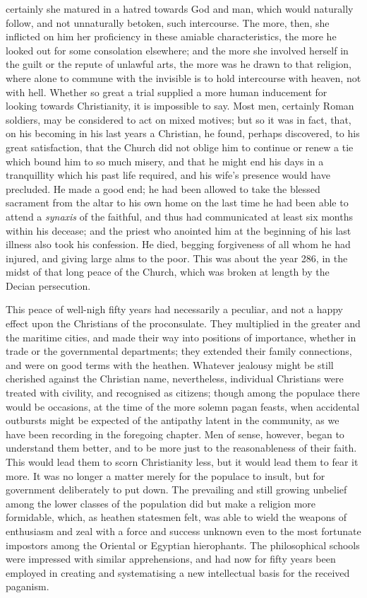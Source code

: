 certainly she matured in a hatred towards God and man, which would
naturally follow, and not unnaturally betoken, such intercourse. The
more, then, she inflicted on him her proficiency in these amiable
characteristics, the more he looked out for some consolation
elsewhere; and the more she involved herself in the guilt or the
repute of unlawful arts, the more was he drawn to that religion, where
alone to commune with the invisible is to hold intercourse with
heaven, not with hell. Whether so great a trial supplied a more human
inducement for looking towards Christianity, it is impossible to say.
Most men, certainly Roman soldiers, may be considered to act on mixed
motives; but so it was in fact, that, on his becoming in his last
years a Christian, he found, perhaps discovered, to his great
satisfaction, that the Church did not oblige him to continue or
renew a tie which bound him to so much misery, and that he might end
his days in a tranquillity which his past life required, and his
wife's presence would have precluded. He made a good end; he had been
allowed to take the blessed sacrament from the altar to his own home
on the last time he had been able to attend a \emph{synaxis} of the
faithful, and thus had communicated at least six months within his
decease; and the priest who anointed him at the beginning of his last
illness also took his confession. He died, begging forgiveness of all
whom he had injured, and giving large alms to the poor. This was about
the year 286, in the midst of that long peace of the Church, which was
broken at length by the Decian persecution.

This peace of well-nigh fifty years had necessarily a peculiar, and
not a happy effect upon the Christians of the proconsulate. They
multiplied in the greater and the maritime cities, and made their way
into positions of importance, whether in trade or the governmental
departments; they extended their family connections, and were on good
terms with the heathen. Whatever jealousy might be still cherished
against the Christian name, nevertheless, individual Christians were
treated with civility, and recognised as citizens; though among the
populace there would be occasions, at the time of the more solemn
pagan feasts, when accidental outbursts might be expected of the
antipathy latent in the community, as we have been recording in
the foregoing chapter. Men of sense, however, began to understand them
better, and to be more just to the reasonableness of their faith. This
would lead them to scorn Christianity less, but it would lead them to
fear it more. It was no longer a matter merely for the populace to
insult, but for government deliberately to put down. The prevailing
and still growing unbelief among the lower classes of the population
did but make a religion more formidable, which, as heathen statesmen
felt, was able to wield the weapons of enthusiasm and zeal with a
force and success unknown even to the most fortunate impostors among
the Oriental or Egyptian hierophants. The philosophical schools were
impressed with similar apprehensions, and had now for fifty years been
employed in creating and systematising a new intellectual basis for
the received paganism.

